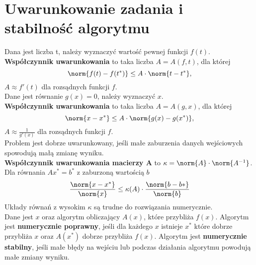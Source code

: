 \section{Uwarunkowanie zadania i stabilność algorytmu}
Dana jest liczba t, należy wyznaczyć wartość pewnej funkcji \( f(t) \). \\
\textbf{Współczynnik uwarunkowania} to taka liczba \( A = A(f,t) \), dla której
\[
    \norm{f(t) - f(t^*)} \leq  A\cdot\norm{t - t^*},
\]
\( A \approx f'(t) \) dla rozsądnych funkcji \( f \). \\

\noindent
Dane jest równanie \( g(x) = 0 \), należy wyznaczyć \( x \). \\
\textbf{Współczynnik uwarunkowania} to taka liczba \( A = A(g,x) \), dla której
\[
    \norm{x - x^*} \leq  A\cdot\norm{g(x) - g(x^*)},
\]
\( A \approx \frac{1}{g'(x)} \) dla rozsądnych funkcji \( f \). \\
Problem jest dobrze uwarunkowany, jeśli małe zaburzenia
danych wejściowych spowodują małą zmianę wyniku. \\

\noindent
\textbf{Współczynnik uwarunkowania macierzy A} to \( \kappa = \norm{A} \cdot \norm{A^{-1}} \). Dla równania \( Ax^* = b^* \) z zaburzoną wartością \( b \)
\[
    \frac{\norm{x-x^*}}{\norm{x}} \leq \kappa(A) \cdot \frac{\norm{b-b*}}{\norm{b}}
\]
Układy równań z wysokim \( \kappa \) są trudne do rozwiązania numerycznie. \\

\noindent
Dane jest \( x \) oraz algorytm obliczający \( A(x) \), które przybliża \( f(x) \). Algorytm jest \textbf{numerycznie poprawny}, jeśli dla każdego \( x \) istnieje \( x^* \) które dobrze przybliża \( x \) oraz \( A(x^*) \) dobrze przybliża \( f(x) \).
Algorytm jest \textbf{numerycznie stabilny}, jeśli małe błędy na wejściu
lub podczas działania algorytmu powodują małe zmiany wyniku.
